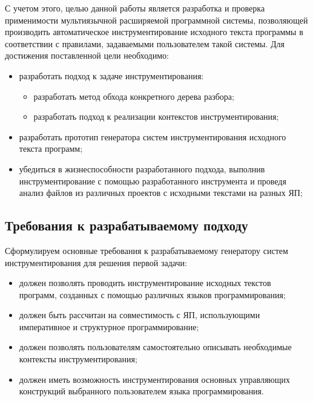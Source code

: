 С учетом этого, целью данной работы является разработка и проверка применимости мультиязычной расширяемой программной системы, позволяющей производить автоматическое инструментирование исходного текста программы в соответствии с правилами, задаваемыми пользователем такой системы.
Для достижения поставленной цели необходимо:
\begin{itemize}[noitemsep]
  \item разработать подход к задаче инструментирования:
    \begin{itemize}[noitemsep]
      \item разработать метод обхода конкретного дерева разбора;
      \item разработать подход к реализации контекстов инструментирования;
    \end{itemize}
  \item разработать прототип генератора систем инструментирования исходного текста программ;
  \item убедиться в жизнеспособности разработанного подхода, выполнив инструментирование с помощью разработанного инструмента и проведя анализ файлов из различных проектов с исходными текстами на разных ЯП;
\end{itemize}

\subsection{Требования к разрабатываемому подходу}

Сформулируем основные требования к разрабатываемому генератору систем инструментирования для решения первой задачи:
\begin{itemize}[noitemsep]
  \item должен позволять проводить инструментирование исходных текстов программ, созданных с помощью различных языков программирования;
  \item должен быть рассчитан на совместимость с ЯП, использующими императивное и структурное программирование;
  \item должен позволять пользователям самостоятельно описывать необходимые контексты инструментирования;
  \item должен иметь возможность инструментирования основных управляющих конструкций выбранного пользователем языка программирования.
\end{itemize}

